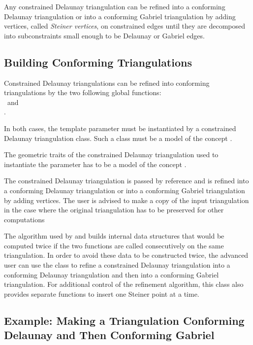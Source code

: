 Any constrained Delaunay triangulation can be refined into a
conforming Delaunay triangulation or into a conforming Gabriel
triangulation by adding vertices, called \emph{Steiner vertices}, on
constrained edges until they are decomposed into subconstraints small enough
to be Delaunay or Gabriel edges.

\subsection{Building Conforming Triangulations}
\label{sec:Mesh_2_building_conforming}

Constrained Delaunay triangulations can be refined into
conforming triangulations 
by the two following global functions: \\
~and\\
. 

In both cases, the template parameter  must be instantiated
by a constrained Delaunay triangulation class.  Such a class must be a
model of the concept .

The geometric traits of the constrained
Delaunay triangulation used to instantiate the parameter  has to
be a model of the concept .

The constrained Delaunay triangulation  is passed by reference
and is refined into a conforming Delaunay triangulation or into a
conforming Gabriel triangulation by adding vertices. The user is advised to
make a copy of the input triangulation in the case where the original
triangulation has to be preserved for other computations

The algorithm used by  and
 builds internal data structures that would be
computed twice if the two functions are called consecutively on the same
triangulation. In order to avoid these data to be constructed twice, the
advanced user can use the class  to
refine a constrained Delaunay triangulation into a conforming Delaunay
triangulation and then into a conforming Gabriel triangulation. For
additional control of the refinement algorithm, this class also provides
separate functions to insert one Steiner point at a time.

\subsection{Example: Making a Triangulation Conforming Delaunay and Then
  Conforming Gabriel}
\label{sec:Mesh_2_example_making_conforming}

